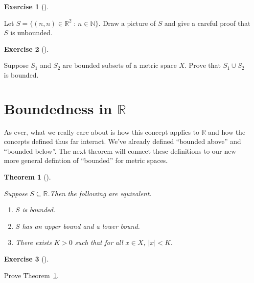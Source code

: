 \documentclass[
  letterpaper,
  DIV=11,
  numbers=noendperiod]{scrreprt}
\providecommand{\tightlist}{%
  \setlength{\itemsep}{0pt}\setlength{\parskip}{0pt}}
\def\R{\mathbb R}
\def\N{\mathbb N}
\newcommand{\st}{~:~}
\theoremstyle{plain}
\newtheorem{theorem}{Theorem}[chapter]
\theoremstyle{definition}
\newtheorem{exercise}{Exercise}[chapter]
\theoremstyle{plain}
\theoremstyle{plain}
\theoremstyle{definition}
\theoremstyle{definition}
\theoremstyle{remark}
\begin{document}
\begin{exercise}[]\protect\hypertarget{exr-unbounded-subset-of-r2}{}\label{exr-unbounded-subset-of-r2}

Let \(S=\{(n,n)\in\R^2\st n\in\N\}\). Draw a picture of \(S\) and give a
careful proof that \(S\) is unbounded.

\end{exercise}

\begin{exercise}[]\protect\hypertarget{exr-union-of-two-bounded-is-bounded}{}\label{exr-union-of-two-bounded-is-bounded}

Suppose \(S_1\) and \(S_2\) are bounded subsets of a metric space \(X\).
Prove that \(S_1\cup S_2\) is bounded.

\end{exercise}

\section{\texorpdfstring{Boundedness in
\(\R\)}{Boundedness in \textbackslash R}}\label{boundedness-in-r}

As ever, what we really care about is how this concept applies to \(\R\)
and how the concepts defined thus far interact. We've already defined
``bounded above'' and ``bounded below''. The next theorem will connect
these definitions to our new more general defintion of ``bounded'' for
metric spaces.

\begin{theorem}[]\protect\hypertarget{thm-boundedness-in-r}{}\label{thm-boundedness-in-r}

Suppose \(S\subseteq\R\).Then the following are equivalent.

\begin{enumerate}
\def\labelenumi{\arabic{enumi}.}
\tightlist
\item
  \(S\) is bounded.
\item
  \(S\) has an upper bound and a lower bound.
\item
  There exists \(K>0\) such that for all \(x\in X\), \(|x|<K\).
\end{enumerate}

\end{theorem}

\begin{exercise}[]\protect\hypertarget{exr-boundedness-in-r}{}\label{exr-boundedness-in-r}

Prove Theorem~\ref{thm-boundedness-in-r}.

\end{exercise}
\end{document}
